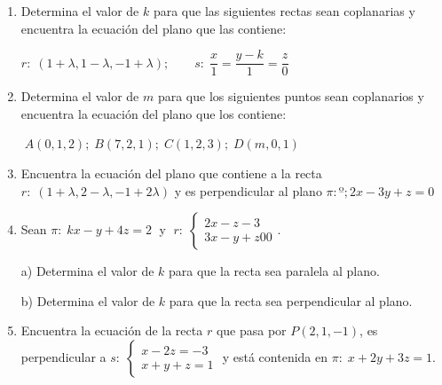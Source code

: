 \begin{enumerate}
\item Determina el valor de $k$ para que las siguientes rectas sean coplanarias y encuentra la ecuación del plano que las contiene:

$r:\; (1+\lambda,1-\lambda,-1+\lambda);\qquad s:\; \dfrac x 1 =\dfrac {y-k} 1 = \dfrac z 0$

\vspace{2mm} 

\item Determina el valor de $m$ para que los siguientes puntos sean coplanarios y encuentra la ecuación del plano que los contiene:

$\;A(0,1,2); \;B(7,2,1); \;C(1,2,3); \;D(m,0,1)$

\vspace{2mm} 

\item Encuentra la ecuación del plano que contiene a la recta $r:\; (1+\lambda, 2-\lambda,-1+2\lambda)$ y es perpendicular al plano $\pi:º; 2x-3y+z=0$

\vspace{2mm} 

\item Sean $\pi: \; kx-y+4z=2\;$ y $\;r:\; \begin{cases} 2x-z-3\\3x-y+z00\end{cases}$.

a) Determina el valor de $k$ para que la recta sea paralela al plano.

b) Determina el valor de $k$ para que la recta sea perpendicular al plano.

\vspace{2mm} 

\item Encuentra la ecuación de la recta $r$ que pasa por $P(2,1,-1)$, es perpendicular a $s:\; \begin{cases} x-2z=-3\\x+y+z=1\end{cases}$ y está contenida en $\pi:\; x+2y+3z=1$.

\vspace{2mm} 


\end{enumerate}
